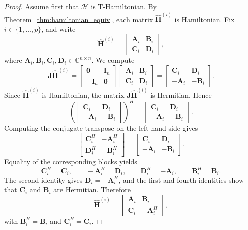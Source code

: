 \documentclass[pdflatex,sn-mathphys-ay]{sn-jnl}
\newcommand{\T}[1]{\mathcal{#1}}    %
\newcommand{\M}[1]{\bm{#1}}     %
\newcommand{\C}{\mathbb{C}}         %
\theoremstyle{thmstyleone}
\theoremstyle{thmstyletwo}
\theoremstyle{thmstylethree}
\numberwithin{equation}{section}
\begin{document}
\begin{proof}
Assume first that $\T{H}$ is T-Hamiltonian. By Theorem~\ref{thm:hamiltonian_equiv}, each matrix $\widehat{\M{H}}^{(i)}$ is Hamiltonian. Fix $i \in \{1,\dots,p\}$, and write
$$
\widehat{\M{H}}^{(i)} =
\begin{bmatrix}
\M{A}_i & \M{B}_i \\
\M{C}_i & \M{D}_i
\end{bmatrix},
$$
where $\M{A}_i,\M{B}_i,\M{C}_i,\M{D}_i \in \C^{n\times n}$. We compute
$$
\M{J}\widehat{\M{H}}^{(i)}
=
\begin{bmatrix}
\M{0} & \M{I}_n \\
-\M{I}_n & \M{0}
\end{bmatrix}
\begin{bmatrix}
\M{A}_i & \M{B}_i \\
\M{C}_i & \M{D}_i
\end{bmatrix}
=
\begin{bmatrix}
\M{C}_i & \M{D}_i \\
-\M{A}_i & -\M{B}_i
\end{bmatrix}.
$$
Since $\widehat{\M{H}}^{(i)}$ is Hamiltonian, the matrix $\M{J}\widehat{\M{H}}^{(i)}$ is Hermitian. Hence
$$
\left(
\begin{bmatrix}
\M{C}_i & \M{D}_i \\
-\M{A}_i & -\M{B}_i
\end{bmatrix}
\right)^H
=
\begin{bmatrix}
\M{C}_i & \M{D}_i \\
-\M{A}_i & -\M{B}_i
\end{bmatrix}.
$$
Computing the conjugate transpose on the left-hand side gives
$$
\begin{bmatrix}
\M{C}_i^H & -\M{A}_i^H \\
\M{D}_i^H & -\M{B}_i^H
\end{bmatrix}
=
\begin{bmatrix}
\M{C}_i & \M{D}_i \\
-\M{A}_i & -\M{B}_i
\end{bmatrix}.
$$
Equality of the corresponding blocks yields
$$
\M{C}_i^H = \M{C}_i, \qquad
-\M{A}_i^H = \M{D}_i, \qquad
\M{D}_i^H = -\M{A}_i, \qquad
\M{B}_i^H = \M{B}_i.
$$
The second identity gives $\M{D}_i = -\M{A}_i^H$, and the first and fourth identities show that $\M{C}_i$ and $\M{B}_i$ are Hermitian. Therefore
$$
\widehat{\M{H}}^{(i)} =
\begin{bmatrix}
\M{A}_i & \M{B}_i \\
\M{C}_i & -\M{A}_i^H
\end{bmatrix},
$$
with $\M{B}_i^H = \M{B}_i$ and $\M{C}_i^H = \M{C}_i$.


\end{proof}
\end{document}
